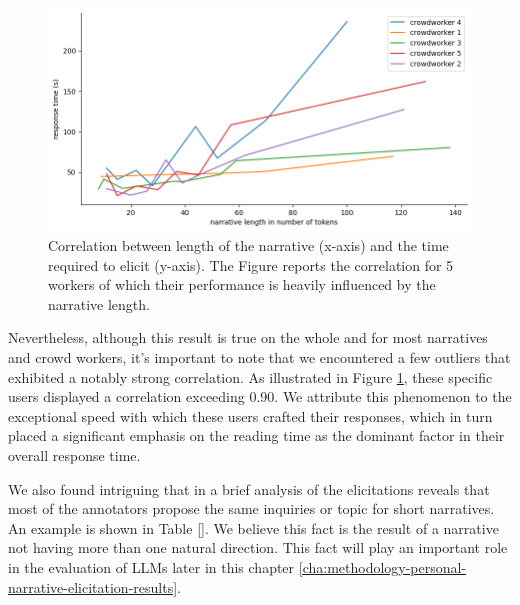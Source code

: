 \begin{figure}[!htbp]
        \includegraphics[width=1\linewidth]{assets//imgs/dataset-high-correlation-workers.png}
        \caption{Correlation between length of the narrative (x-axis) and the time required to elicit (y-axis). The Figure reports the correlation for 5 workers of which their performance is heavily influenced by the narrative length.}
        \label{fig:dataset-high-correlation-workers}
\end{figure}
Nevertheless, although this result is true on the whole and for most narratives and crowd workers, it's important to note that we encountered a few outliers that exhibited a notably strong correlation. As illustrated in Figure \ref{fig:dataset-high-correlation-workers}, these specific users displayed a correlation exceeding 0.90. We attribute this phenomenon to the exceptional speed with which these users crafted their responses, which in turn placed a significant emphasis on the reading time as the dominant factor in their overall response time.

We also found intriguing that in a brief analysis of the elicitations reveals that most of the annotators propose the same inquiries or topic for short narratives. An example is shown in Table \ref{}. We believe this fact is the result of a narrative not having more than one natural direction. This fact will play an important role in the evaluation of LLMs later in this chapter \ref{cha:methodology-personal-narrative-elicitation-results}.
